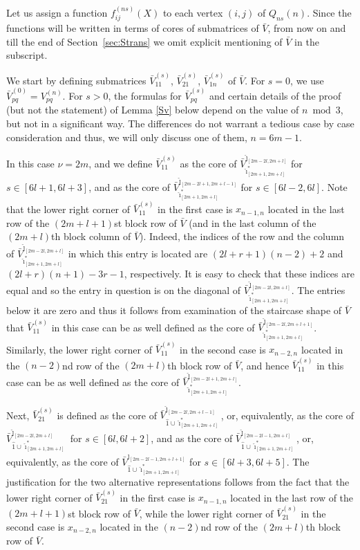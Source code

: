 \documentclass{amsart}
\theoremstyle{definition}
\theoremstyle{remark}
\numberwithin{equation}{section}
\numberwithin{theorem}{section}
\begin{document}
Let us assign a function $f_{ij}^{(ns)}(X)$ to each vertex $(i,j)$ of $Q_{ns}(n)$.
Since the functions will be written in terms of cores of submatrices of $\bar V$, from now on and till the end
of Section~\ref{sec:Strans} we omit explicit mentioning
of $\bar V$ in the subscript.

We start by defining submatrices  $\bar V_{11}^{(s)}$,  $\bar V_{21}^{(s)}$,  $\bar V_{1n}^{(s)}$ of $\bar V$. 
For $s=0$, we use 
$\bar V_{pq}^{(0)}= V^{(n)}_{pq}$. For $s>0$, the
formulas for $\bar V_{pq}^{(s)}$ and certain details of the proof (but not the statement) of Lemma \ref{Sv} below depend on the value of 
$n \bmod 3$, but not in a significant way. The differences do not warrant a tedious case by case consideration and thus, we will only discuss one of them, $n=6m - 1$.

In this case $\nu=2m$, and we define $\bar V_{11}^{(s)}$ as the core of
$\bar V^{\hat \jmath_{[2m-2l,2m+l]}}_{ \hat \imath^*_{[2m+1,2m+l]}}$ for $s\in[6l+1,6l+3]$, and as
the core of $\bar V^{\hat \jmath_{[2m-2l+1,2m+l-1]}}_{ \hat \imath^*_{[2m+1,2m+l]}}$ for $s\in[6l-2,6l]$.
Note that the lower right corner of $\bar V_{11}^{(s)}$ in the first case is $x_{n-1,n}$ 
located in the last row of the $(2m+l+1)$st block row of $\bar V$ (and in 
the last column of the $(2m+l)$th block column of $\bar V$). Indeed, the indices
of the row and the column of $\bar V^{\hat \jmath_{[2m-2l,2m+l]}}_{ \hat \imath^*_{[2m+1,2m+l]}}$ in
  which this entry is located are $(2l+r+1)(n-2) + 2$ and $(2l+r)(n+1) - 3r - 1$, respectively. 
  It is easy to check that these indices are equal and so the entry in question is on the diagonal of $\bar V^{\hat \jmath_{[2m-2l,2m+l]}}_{ \hat \imath^*_{[2m+1,2m+l]}}$. The entries below it are zero and thus it follows from examination of the staircase shape of $\bar V$ that $\bar V_{11}^{(s)}$ in this case can be as well
defined as the core of $\bar V^{\hat \jmath_{[2m-2l,2m+l+1]}}_{ \hat \imath^*_{[2m+1,2m+l]}}$.
Similarly, the lower right corner of $\bar V_{11}^{(s)}$ in the second case is $x_{n-2,n}$ located in the $(n-2)$nd  row of the $(2m+l)$th block row of $\bar V$, and hence $\bar V_{11}^{(s)}$ in this case can be as well defined as the core of $\bar V^{\hat \jmath_{[2m-2l+1,2m+l]}}_{\hat\imath^*_{[2m+1,2m+l]}}$. 

Next, $\bar V_{21}^{(s)}$ is defined as the core of $\bar V^{\hat \jmath_{[2m-2l,2m+l-1]}}_{\hat 1\cup \hat \imath^*_{[2m+1,2m+l]}}$, or, equivalently, as the core of  $\bar V^{\hat \jmath_{[2m-2l,2m+l]}}_{\hat 1\cup \hat \imath^*_{[2m+1,2m+l]}}$
for $s\in[6l,6l+2]$, and as the core of
$\bar V^{\hat \jmath_{[2m-2l-1,2m+l]}}_{\hat 1\cup \hat \imath^*_{[2m+1,2m+l]}}$, or, equivalently, as the core of
 $\bar V^{\hat \jmath_{[2m-2l-1,2m+l+1]}}_{\hat 1\cup \hat \imath^*_{[2m+1,2m+l]}}$ for $s\in[6l+3,6l+5]$.
The justification for the two alternative representations follows from the fact that 
the lower right corner of $\bar V_{21}^{(s)}$ in the first case is $x_{n-1,n}$ located in the last row of the $(2m+l+1)$st block row of $\bar V$, while the lower right corner of $\bar V_{21}^{(s)}$ in
the second case is $x_{n-2,n}$ located in the $(n-2)$nd  row of the $(2m+l)$th block row of $\bar V$. 
\end{document}

